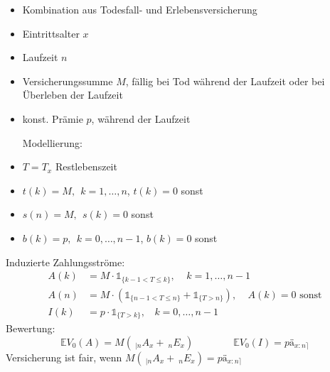 \begin{enumerate}[(a)]
	\begin{minipage}[t]{9cm}
		\begin{itemize}
			\item Kombination aus Todesfall- und Erlebensversicherung
			\item Eintrittsalter $x$
			\item Laufzeit $n$
			\item Versicherungssumme $M$, fällig bei Tod während der Laufzeit oder bei Überleben der Laufzeit
			\item konst. Prämie $p$, während der Laufzeit
		\end{itemize}
	\end{minipage}
	\begin{minipage}[t]{9cm}
		\begin{itemize}
			\item[Modellierung:]
			\item $T=T_x$ Restlebenszeit
			\item $t(k)=M,~~ k=1,\dots,n$, $t(k)=0$ sonst
			\item $s(n)=M,~~ s(k)=0$ sonst
			\item $b(k)=p,~~ k=0,\dots,n-1$, $b(k)=0$ sonst
		\end{itemize}
	\end{minipage}
	Induzierte Zahlungsströme:
	\begin{equation*}
	\begin{aligned}
		A(k) &= M\cdot \mathbb{1}_{\{k-1<T\le k \}}, ~~~~~k=1,\dots,n-1\\
		A(n) &= M\cdot (\mathbb{1}_{\{n-1<T \le n \}}+\mathbb{1}_{\{T>n\}}), ~~~~~A(k)=0 \text{ sonst}\\
		I(k) &= p\cdot \mathbb{1}_{\{T>k\}},~~~~k=0,\dots,n-1
	\end{aligned}
	\end{equation*}
	Bewertung: 
	\[ 
	\mathds{E}V_0(A)=M(~_{|n}A_x + ~_nE_x) \qquad \qquad \mathds{E}V_0(I)=p ä_{x:n\rceil}
	\]
	Versicherung ist fair, wenn $M(~_{|n}A_x + ~_nE_x)=p ä_{x:n\rceil}$
\end{enumerate}

